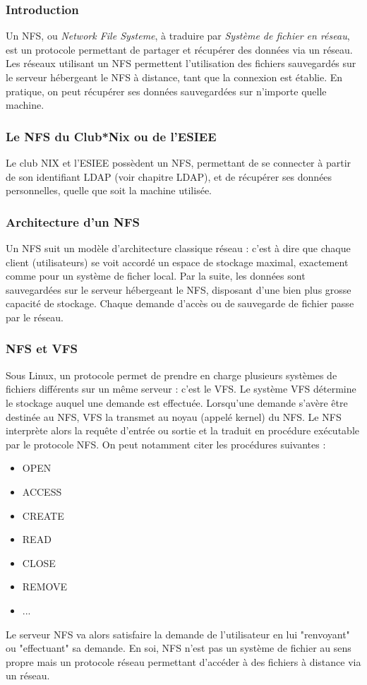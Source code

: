 \subsubsection{Introduction}

Un NFS, ou \textit{Network File Systeme}, à traduire par \textit{Système de fichier en réseau}, est un protocole permettant
de partager et récupérer des données via un réseau. Les réseaux utilisant un NFS permettent l'utilisation des fichiers sauvegardés
 sur le serveur hébergeant le NFS à distance, tant que la connexion est établie. En pratique, on peut récupérer
 ses données sauvegardées sur n'importe quelle machine.


\subsubsection{Le NFS du Club*Nix ou de l'ESIEE}

Le club NIX et l'ESIEE possèdent un NFS, permettant de se connecter à partir de son identifiant LDAP (voir chapitre LDAP),
 et de récupérer ses données personnelles, quelle que soit la machine utilisée.
\subsubsection{Architecture d'un NFS}
Un NFS suit un modèle d'architecture classique réseau : c'est à dire que chaque client (utilisateurs) se voit accordé
 un espace de stockage maximal, exactement comme pour un système de ficher local. Par la suite, les données sont sauvegardées
 sur le serveur hébergeant le NFS, disposant d'une bien plus grosse capacité de stockage. Chaque demande d'accès
  ou de sauvegarde de fichier passe par le réseau.


\subsubsection{NFS et VFS}
Sous Linux, un protocole permet de prendre en charge plusieurs systèmes de fichiers différents sur un même serveur :
c'est le VFS. Le système VFS détermine le stockage auquel une demande est effectuée.
Lorsqu'une demande s'avère être destinée au NFS, VFS la transmet au noyau (appelé kernel) du NFS. Le NFS interprète
alors la requête d'entrée ou sortie et la traduit en procédure exécutable par le protocole NFS.
On peut notamment citer les procédures suivantes :
\begin{itemize}
  \item OPEN
  \item ACCESS
  \item CREATE
  \item READ
  \item CLOSE
  \item REMOVE
  \item ...
\end{itemize}
Le serveur NFS va alors satisfaire la demande de l'utilisateur en lui "renvoyant" ou "effectuant" sa demande.
En soi, NFS n'est pas un système de fichier au sens propre mais un protocole réseau permettant d'accéder à des fichiers
à distance via un réseau.


